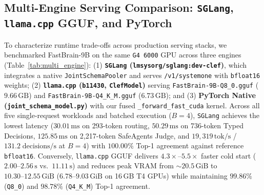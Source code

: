 \documentclass[10pt,twocolumn]{article}
\begin{document}
\subsection{Multi-Engine Serving Comparison: \texttt{SGLang}, \texttt{llama.cpp} GGUF, and PyTorch}
\label{sec:multi_engine}
To characterize runtime trade-offs across production serving stacks, we benchmarked FastBrain-9B on the same \texttt{G4 6000} GPU across three engines (Table~\ref{tab:multi_engine}): (1) \textbf{\texttt{SGLang} (\texttt{lmsysorg/sglang:dev-clef})}, which integrates a native \texttt{JointSchemaPooler} and serves \texttt{/v1/systemone} with \texttt{bfloat16} weights; (2) \textbf{\texttt{llama.cpp} (\texttt{b11430}, \texttt{ClefModel})} serving \texttt{FastBrain-9B-Q8\_0.gguf} ($9.66\,\text{GB}$) and \texttt{FastBrain-9B-Q4\_K\_M.gguf} ($6.73\,\text{GB}$); and (3) \textbf{PyTorch Native (\texttt{joint\_schema\_model.py})} with our fused \texttt{\_forward\_fast\_cuda} kernel. Across all five single-request workloads and batched execution ($B=4$), \texttt{SGLang} achieves the lowest latency ($30.01\,\text{ms}$ on 293-token routing, $50.29\,\text{ms}$ on 736-token Typed Decisions, $125.85\,\text{ms}$ on 2,217-token SafeAgents Judge, and $19{,}319\,\text{tok/s}$ / $131.2\;\text{decisions/s}$ at $B=4$) with $100.00\%$ Top-1 agreement against reference \texttt{bfloat16}. Conversely, \texttt{llama.cpp} GGUF delivers $4.3\times$--$5.5\times$ faster cold start ($2.00\text{--}2.56\,\text{s}$ vs.\ $11.11\,\text{s}$) and reduces peak VRAM from $\sim 20.5\,\text{GiB}$ to $10.30\text{--}12.55\,\text{GiB}$ ($6.78\text{--}9.03\,\text{GiB}$ on 16\,GB T4 GPUs) while maintaining $99.86\%$ (\texttt{Q8\_0}) and $98.78\%$ (\texttt{Q4\_K\_M}) Top-1 agreement.
\end{document}
